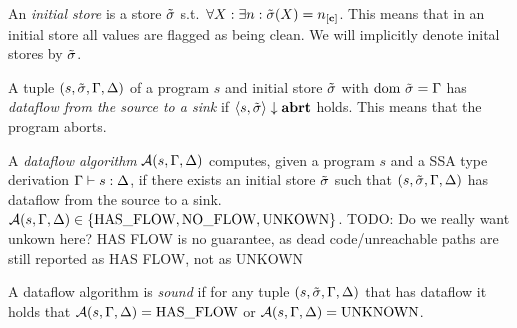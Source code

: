 \begin{definition}
    An \emph{initial store} is a store $\tilde{\sigma}$ s.t.\ 
    $\forall X: \exists n: \initialstore(X) = \clean[n]$.
    This means that in an initial store all values are flagged as being clean.
    We will implicitly denote inital stores by $\tilde{\sigma}$.
\end{definition}

\begin{definition}[Dataflow]
    A tuple $(s, \tilde{\sigma}, \Gamma, \Delta)$ of a program $s$ and initial store $\tilde{\sigma}{}$ 
    with $\text{dom }{\tilde{\sigma}{}} = \Gamma$
    has \emph{dataflow from the source to a sink} if
    $\langle s, \tilde{\sigma}{} \rangle \downarrow \textbf{abrt}$ holds.
    This means that the program aborts.
\end{definition}

\begin{definition}
    A \emph{dataflow algorithm} $\operatorname{\mathcal{A}}(s, \Gamma, \Delta)$ computes, given a program $s$
    and a SSA type derivation $\Gamma \vdash {s}: \Delta$,
    if there exists an initial store $\tilde{\sigma}{}$ 
    such that $(s, \tilde{\sigma}, \Gamma, \Delta)$ has dataflow from the source to a sink.
    $\operatorname{\mathcal{A}}(s, \Gamma, \Delta) \in \{\text{HAS\_FLOW}, \text{NO\_FLOW}, \text{UNKOWN}\}$.
    TODO: Do we really want unkown here? HAS FLOW is no guarantee, as dead code/unreachable paths 
    are still reported as HAS FLOW, not as UNKOWN
\end{definition}

\begin{definition}[Soundness]
    A dataflow algorithm is \emph{sound} if for any tuple $(s, \tilde{\sigma}, \Gamma, \Delta)$ that
    has dataflow it holds that $\operatorname{\mathcal{A}}(s, \Gamma, \Delta) = \text{HAS\_FLOW}$ or
    $\operatorname{\mathcal{A}}(s, \Gamma, \Delta) = \text{UNKNOWN}$.
\end{definition}

